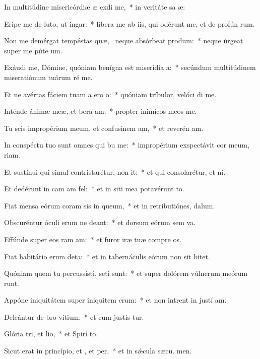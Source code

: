 \item In multitúdine misericórdiæ æ exdi me,~* in veritáte sa æ:
\item Eripe me de luto, ut  ingar:~* líbera me ab iis, qui odérunt me, et de profún rum.
\item Non me demérgat tempéstas quæ,~\pscross{} neque absórbeat  produm:~* neque úrgeat super me púte  um.
\item Exáudi me, Dómine, quóniam benígna est miseridia a:~* secúndum multitúdinem miseratiónum tuárum ré  me.
\item Et ne avértas fáciem tuam a ero o:~* quóniam tríbulor, velóci di me.
\item Inténde ánimæ meæ, et bera am:~* propter inimícos meos  me.
\item Tu scis impropérium meum, et confusinem am,~* et reverén am.
\item In conspéctu tuo sunt omnes qui bu me:~* impropérium exspectávit cor meum,  riam.
\item Et sustínui qui simul contristarétur,  non it:~* et qui consolarétur, et  ni.
\item Et dedérunt in cam am fel:~* et in siti mea potavérunt  to.
\item Fiat mensa eórum coram sis in queum,~* et in retributiónes,   dalum.
\item Obscuréntur óculi erum ne deant:~* et dorsum eórum sem va.
\item Effúnde super eos ram am:~* et furor iræ tuæ compre os.
\item Fiat habitátio erum deta:~* et in tabernáculis eórum non sit  bitet.
\item Quóniam quem tu percussísti, seti sunt:~* et super dolórem vúlnerum meórum runt.
\item Appóne iniquitátem super iniquitem erum:~* et non intrent in justí am.
\item Deleántur de bro vitium:~* et cum justis  tur.
\item Glória tri, et lio,~* et Spirí to.
\item Sicut erat in princípio, et , et per,~* et in sǽcula sæcu. men.
